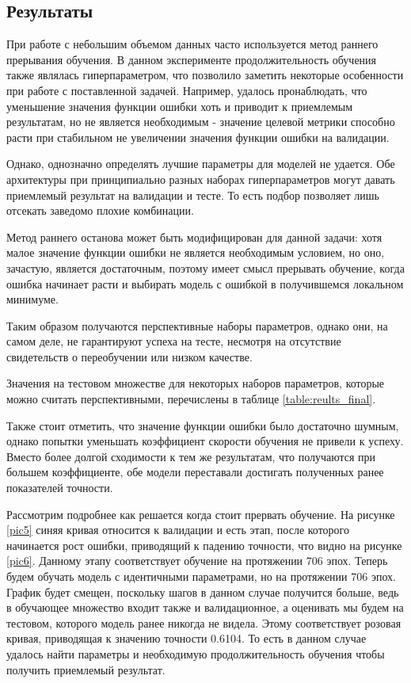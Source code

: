\documentclass[diploma]{nanolab2015}
\begin{document}
\subsection{Результаты}
При работе с небольшим объемом данных часто используется метод раннего прерывания обучения. В данном эксперименте продолжительность обучения также являлась гиперпараметром, что позволило заметить некоторые особенности при работе с поставленной задачей. Например, удалось пронаблюдать, что уменьшение значения функции ошибки хоть и приводит к приемлемым результатам, но не является необходимым - значение целевой метрики способно расти при стабильном не увеличении значения функции ошибки на валидации.

Однако, однозначно определять лучшие параметры для моделей не удается. Обе архитектуры при принципиально разных наборах гиперпараметров могут давать приемлемый результат на валидации и тесте. То есть подбор позволяет лишь отсекать заведомо плохие комбинации.

Метод раннего останова может быть модифицирован для данной задачи: хотя малое значение функции ошибки не является необходимым условием, но оно, зачастую, является достаточным, поэтому имеет смысл прерывать обучение, когда ошибка начинает расти и выбирать модель с ошибкой в получившемся локальном минимуме.

Таким образом получаются перспективные наборы параметров, однако они, на самом деле, не гарантируют успеха на тесте, несмотря на отсутствие свидетельств о переобучении или низком качестве.

Значения на тестовом множестве для некоторых наборов параметров, которые можно считать перспективными, перечислены в таблице \ref{table:reults_final}.

Также стоит отметить, что значение функции ошибки было достаточно шумным, однако попытки уменьшать коэффициент скорости обучения не привели к успеху. Вместо более долгой сходимости к тем же результатам, что получаются при большем коэффициенте, обе модели переставали достигать полученных ранее показателей точности.

Рассмотрим подробнее как решается когда стоит прервать обучение. На рисунке \ref{pic5} синяя кривая относится к валидации и есть этап, после которого начинается рост ошибки, приводящий к падению точности, что видно на рисунке \ref{pic6}. Данному этапу соответствует обучение на протяжении 706 эпох. Теперь будем обучать модель с идентичными параметрами, но на протяжении 706 эпох. График будет смещен, поскольку шагов в данном случае получится больше, ведь в обучающее множество входит также и валидационное, а оценивать мы будем на тестовом, которого модель ранее никогда не видела. Этому соответствует розовая кривая, приводящая к значению точности 0.6104. То есть в данном случае удалось найти параметры и необходимую продолжительность обучения чтобы получить приемлемый результат.
\end{document}
